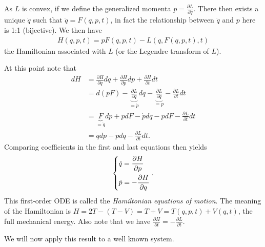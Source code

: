 \begin{ex}
As $L$ is convex, if we define the generalized momenta $p=\frac{\partial L}{\partial \dot{q}}$. There then exists a unique $\dot{q}$ such that $\dot{q} = F(q,p,t)$, in fact the relationship between $\dot{q}$ and $p$ here is 1:1 (bijective). We then have
\begin{align}
	H(q,p,t) = p F(q,p,t) - L (q, F(q,p,t), t)
\end{align}
the Hamiltonian associated with $L$ (or the Legendre transform of $L$).

At this point note that
\begin{align}
	dH &= \frac{\partial H}{\partial q}dq + \frac{\partial H}{\partial p}dp + \frac{\partial H}{\partial t}dt \\
	   &= d(pF) - \underbrace{\frac{\partial L}{\partial q}}_{=\dot{p}} dq - \underbrace{\frac{\partial L}{\partial \dot{q}}}_{=p} - \frac{\partial L}{\partial t}dt \\
	   &= \underbrace{F}_{=\dot{q}}dp + pdF - \dot{p}dq - pdF - \frac{\partial L}{\partial t}dt \\
	   &= \dot{q}dp - \dot{p}dq - \frac{\partial L}{\partial t}dt.
\end{align}
Comparing coefficients in the first and last equations then yields
\begin{align}
	\begin{dcases}
		\dot{q} = \frac{\partial H}{\partial p}\\
		\dot{p} = -\frac{\partial H}{\partial q}
	\end{dcases}
.	
\end{align}
This first-order ODE is called the \emph{Hamiltonian equations of motion}. The meaning of the Hamiltonian is $H= 2T - (T-V) = T+V = T(q,p,t) + V(q,t)$, the full mechanical energy. Also note that we have $\frac{\partial H}{\partial t} = - \frac{\partial L}{\partial t}$.
\end{ex}

We will now apply this result to a well known system.

